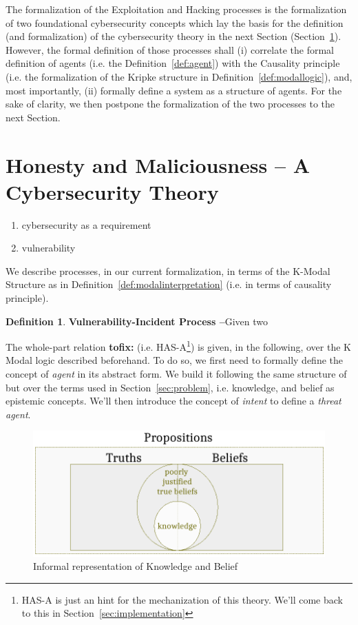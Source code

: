 \documentclass{article}
\newcommand{\fix}[2]{{\color{red} {\bf tofix:} #2}}
\theoremstyle{definition}
\newtheorem{definition}{Definition}[section]
\theoremstyle{corollary}
\theoremstyle{lemma}
\theoremstyle{theorem}
\theoremstyle{theorem}
\begin{document}
The formalization of the Exploitation and Hacking processes is the
formalization of two foundational cybersecurity concepts which lay the basis
for the definition (and formalization) of the cybersecurity theory in the next
Section (Section~\ref{sec:theory}). However, the formal definition of those
processes shall (i) correlate the formal definition of agents (i.e. the
Definition~\ref{def:agent}) with the Causality principle (i.e. the
formalization of the Kripke structure in Definition~\ref{def:modallogic}), and,
most importantly, (ii) formally define a system as a structure of agents. For
the sake of clarity, we then postpone the formalization of the two processes to
the next Section.

\section{Honesty and Maliciousness -- A Cybersecurity Theory}\label{sec:theory}
\begin{enumerate}[noitemsep]
	\item cybersecurity as a requirement
	\item vulnerability\label{def:vulnerability}
\end{enumerate}

We describe processes, in our current formalization, in terms of the K-Modal
Structure as in Definition~\ref{def:modalinterpretation} (i.e. in terms of
causality principle). 

\begin{definition}{\bf Vulnerability-Incident Process --}\label{def:vulnerability-incident}
	Given two 
\end{definition}

The whole-part relation \fix{mr}{(i.e.  HAS-A\footnote{HAS-A is just an hint for the
mechanization of this theory.  We'll come back to this in
Section~\ref{sec:implementation}})} is given, in the following, over the K Modal
logic described beforehand. To do so, we first need to formally define the
concept of \emph{agent} in its abstract form. We build it following the same
structure of\autocite{Santaca2016abf} but over the terms used in
Section~\ref{sec:problem}, i.e. knowledge, and belief as epistemic concepts. We'll then 
introduce the concept of \emph{intent} to define a \emph{threat agent}.

\begin{figure}[t]
	\centering
	\includegraphics[width=.8\textwidth]{knowledge-belief.pdf}
	\caption{Informal representation of Knowledge and Belief}
	\label{fig:knowledge-belief}
\end{figure}
\end{document}
